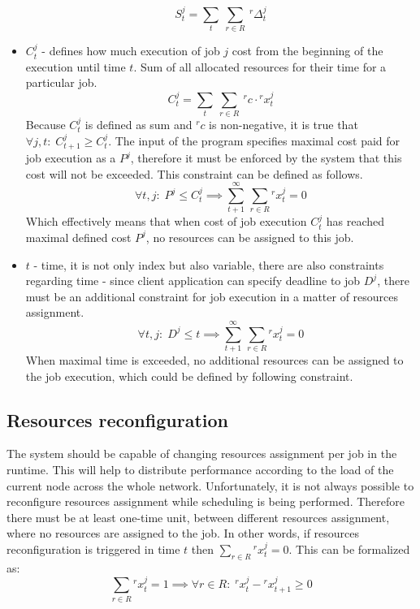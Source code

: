 \begin{itemize}
\begin{equation}
              S_{t}^{j} = \sum_{t}\:\sum_{r \in R}\: {}^{r}\Delta_{t}^{j} 
          \end{equation}
    \item $C_{t}^{j}$ - defines how much execution of job $j$ cost from the beginning of the execution until time $t$.
          Sum of all allocated resources for their time for a particular job.
          \begin{equation}
              C_{t}^{j} = \sum_{t}\:\sum_{r \in R}\: {}^{r}c \cdot {}^{r}x_{t}^{j} 
          \end{equation}
          Because $C_{t}^{j}$ is defined as sum and ${}^{r}c$ is non-negative,
          it is true that $\forall j, t:\; C_{t+1}^{j} \geq C_{t}^{j}$.
          The input of the program specifies maximal cost paid for job execution as a $P^j$, 
          therefore it must be enforced by the system that this cost will not be exceeded.
          This constraint can be defined as follows.
          \begin{equation}
              \forall t, j:\; P^{j} \leq C_{t}^{j} \implies \sum_{t+1}^{\infty} \, \sum_{r \in R} {}^{r}x_{t}^{j} = 0 
          \end{equation}
          Which effectively means that when cost of job execution $C_{t}^{j}$ has reached maximal defined cost $P^{j}$,
          no resources can be assigned to this job.
    \item $t$ - time, it is not only index but also variable, there are also constraints regarding time -
          since client application can specify deadline to job $D^{j}$,
          there must be an additional constraint for job execution in a matter of resources assignment.
          \begin{equation}
              \forall t, j:\; D^{j} \leq t \implies \sum_{t+1}^{\infty} \, \sum_{r \in R} {}^{r}x_{t}^{j} = 0 
          \end{equation}
          When maximal time is exceeded, no additional resources can be assigned to the job execution, 
          which could be defined by following constraint.
\end{itemize}

\subsection{Resources reconfiguration}\label{subsec:resource-config}
The system should be capable of changing resources assignment per job in the runtime.
This will help to distribute performance according to the load of the current node across the whole network.
Unfortunately, it is not always possible to reconfigure resources assignment while scheduling is being performed.
Therefore there must be at least one-time unit, between different resources assignment,
where no resources are assigned to the job.
In other words, if resources reconfiguration is triggered in time $t$ then $\sum_{r \in R} {}^{r}x_{t}^{j} = 0$.
This can be formalized as:
\begin{equation}
    \sum_{r \in R} {}^{r}x_{t}^{j} = 1 \implies \forall r \in R:\; {}^{r}x_{t}^{j} - {}^{r}x_{t + 1}^{j} \geq 0
\end{equation}

